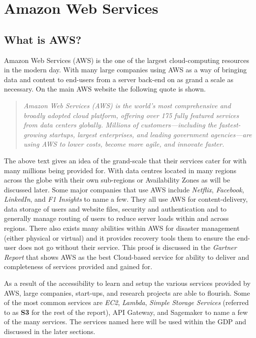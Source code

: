 \section{Amazon Web Services}
\subsection{What is AWS?}
Amazon Web Services (AWS) is the one of the largest cloud-computing resources in the modern day. With many large companies using AWS as a way of bringing data and content to end-users from a server back-end on as grand a scale as necessary. On the main AWS website the following quote is shown.
\begin{quote}
\textit{Amazon Web Services (AWS) is the world’s most comprehensive and broadly adopted cloud platform, offering over 175 fully featured services from data centers globally. Millions of customers—including the fastest-growing startups, largest enterprises, and leading government agencies—are using AWS to lower costs, become more agile, and innovate faster.}  \cite{ch1_2_what_is_aws} 
\end{quote}

The above text gives an idea of the grand-scale that their services cater for with many millions being provided for. With data centres located in many regions across the globe with their own sub-regions or Availability Zones as will be discussed later. Some major companies that use AWS include \textit{Netflix}, \textit{Facebook}, \textit{LinkedIn}, and \textit{F1 Insights} to name a few. They all use AWS for content-delivery, data storage of users and website files, security and authentication and to generally manage routing of users to reduce server loads within and across regions. There also exists many abilities within AWS for disaster management (either physical or virtual) and it provides recovery tools them to ensure the end-user does not go without their service. This proof is discussed in the \textit{Gartner Report} \cite{ch1_2_amazon_is_best} that shows AWS as the best Cloud-based service for ability to deliver and completeness of services provided and gained for.

As a result of the accessibility to learn and setup the various services provided by AWS, large companies, start-ups, and research projects are able to flourish. Some of the most common services are \textit{EC2}, \textit{Lambda}, \textit{Simple Storage Services} (referred to as \textbf{S3} for the rest of the report), API Gateway, and Sagemaker to name a few of the many services. The services named here will be used within the GDP and discussed in the later sections. 

